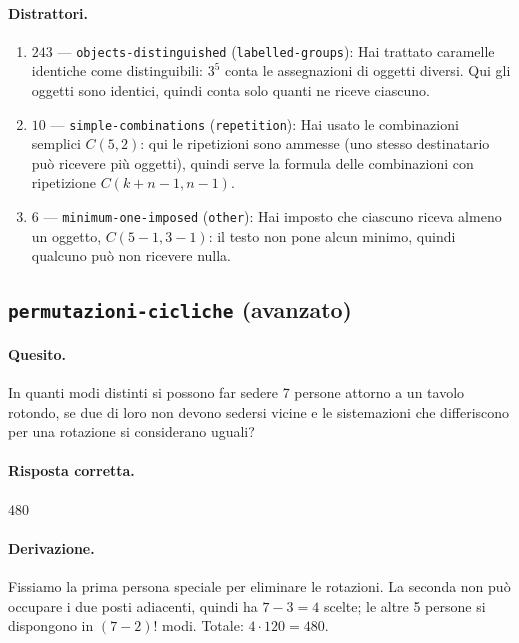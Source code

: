 \paragraph{Distrattori.}
\begin{enumerate}
  \item $243$ --- \texttt{objects-distinguished} (\texttt{labelled-groups}): Hai trattato caramelle identiche come distinguibili: $3^{5}$ conta le assegnazioni di oggetti diversi. Qui gli oggetti sono identici, quindi conta solo quanti ne riceve ciascuno.
  \item $10$ --- \texttt{simple-combinations} (\texttt{repetition}): Hai usato le combinazioni semplici $C(5, 2)$: qui le ripetizioni sono ammesse (uno stesso destinatario può ricevere più oggetti), quindi serve la formula delle combinazioni con ripetizione $C(k + n - 1, n - 1)$.
  \item $6$ --- \texttt{minimum-one-imposed} (\texttt{other}): Hai imposto che ciascuno riceva almeno un oggetto, $C(5 - 1, 3 - 1)$: il testo non pone alcun minimo, quindi qualcuno può non ricevere nulla.
\end{enumerate}

\subsection{\texorpdfstring{\texttt{permutazioni-cicliche} (avanzato)}{permutazioni-cicliche (avanzato)}}

\paragraph{Quesito.} In quanti modi distinti si possono far sedere 7 persone attorno a un tavolo rotondo, se due di loro non devono sedersi vicine e le sistemazioni che differiscono per una rotazione si considerano uguali?

\paragraph{Risposta corretta.} $480$

\paragraph{Derivazione.} Fissiamo la prima persona speciale per eliminare le rotazioni. La seconda non può occupare i due posti adiacenti, quindi ha $7 - 3 = 4$ scelte; le altre 5 persone si dispongono in $(7 - 2)!$ modi. Totale: $4 \cdot  120 = 480$.

